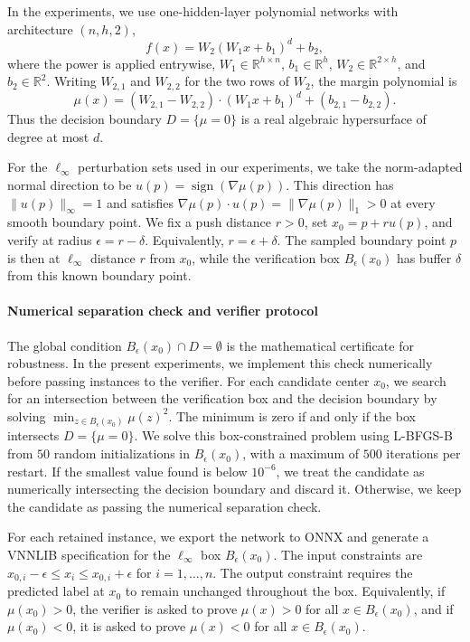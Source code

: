 \documentclass{article}
\theoremstyle{definition}
\begin{document}
In the experiments, we use one-hidden-layer polynomial networks with architecture $(n,h,2)$,
\[
    f(x)=W_2(W_1x+b_1)^d+b_2,
\]
where the power is applied entrywise, $W_1\in\mathbb R^{h\times n}$, $b_1\in\mathbb R^h$, $W_2\in\mathbb R^{2\times h}$, and $b_2\in\mathbb R^2$. Writing $W_{2,1}$ and $W_{2,2}$ for the two rows of $W_2$, the margin polynomial is
\[
    \mu(x)
    =
    (W_{2,1}-W_{2,2})\cdot (W_1x+b_1)^d
    +
    (b_{2,1}-b_{2,2}).
\]
Thus the decision boundary $D=\{\mu=0\}$ is a real algebraic hypersurface of degree at most $d$.

For the $\ell_\infty$ perturbation sets used in our experiments, we take the norm-adapted normal direction to be
$u(p)=\operatorname{sign}(\nabla\mu(p))$. This direction has $\|u(p)\|_\infty=1$ and satisfies
$\nabla\mu(p)\cdot u(p)=\|\nabla\mu(p)\|_1>0$ at every smooth boundary point. We fix a push distance $r>0$, set $x_0=p+r u(p)$, and verify at radius $\epsilon=r-\delta$. Equivalently, $r=\epsilon+\delta$. The sampled boundary point $p$ is then at $\ell_\infty$ distance $r$ from $x_0$, while the verification box $B_\epsilon(x_0)$ has buffer $\delta$ from this known boundary point.



\paragraph{Numerical separation check and verifier protocol}
\label{app:pnn-numerical}

The global condition $B_\epsilon(x_0)\cap D=\emptyset$ is the mathematical certificate for robustness. In the present experiments, we implement this check numerically before passing instances to the verifier. For each candidate center $x_0$, we search for an intersection between the verification box and the decision boundary by solving
$\min_{z\in B_\epsilon(x_0)} \mu(z)^2 .$
The minimum is zero if and only if the box intersects $D=\{\mu=0\}$. We solve this box-constrained problem using L-BFGS-B from $50$ random initializations in $B_\epsilon(x_0)$, with a maximum of $500$ iterations per restart. If the smallest value found is below $10^{-6}$, we treat the candidate as numerically intersecting the decision boundary and discard it. Otherwise, we keep the candidate as passing the numerical separation check.

For each retained instance, we export the network to ONNX and generate a VNNLIB specification for the $\ell_\infty$ box $B_\epsilon(x_0)$. The input constraints are $x_{0,i}-\epsilon\leq x_i\leq x_{0,i}+\epsilon$ for $i=1,\ldots,n$. The output constraint requires the predicted label at $x_0$ to remain unchanged throughout the box. Equivalently, if $\mu(x_0)>0$, the verifier is asked to prove $\mu(x)>0$ for all $x\in B_\epsilon(x_0)$, and if $\mu(x_0)<0$, it is asked to prove $\mu(x)<0$ for all $x\in B_\epsilon(x_0)$.
\end{document}
